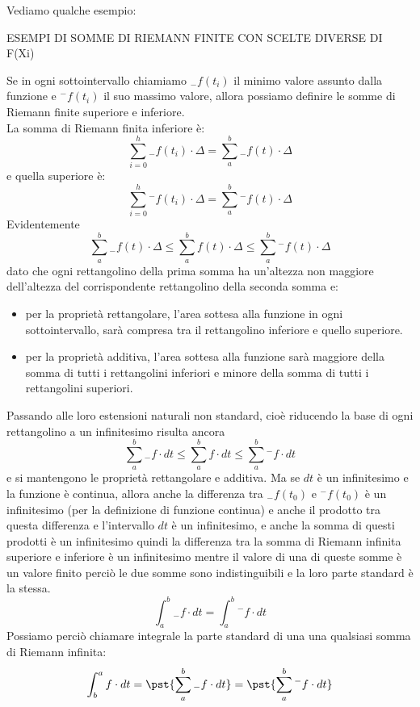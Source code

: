 Vediamo qualche esempio:

ESEMPI DI SOMME DI RIEMANN FINITE CON SCELTE DIVERSE DI F(Xi) %

Se in ogni sottointervallo chiamiamo \({}_{-}f(t_i)\) il minimo valore 
assunto dalla funzione e \({}^{-}f(t_i)\) il suo massimo valore, allora 
possiamo definire le somme di Riemann finite superiore e inferiore. \\
La somma di Riemann finita inferiore è: 
\[\sum_{i=0}^h{}_{-}f(t_i)\cdot\Delta = \sum_a^b{}_{-} f(t) \cdot \Delta\] 
e quella superiore è: 
\[\sum_{i=0}^h {}^{-}f(t_i)\cdot\Delta = \sum_a^b {}^{-}f(t) \cdot \Delta\]
Evidentemente 
\[\sum_a^b{}_{-}f(t) \cdot \Delta \le \sum_a^b f(t) \cdot \Delta \le 
\sum_a^b {}^{-}f(t) \cdot \Delta\] 
dato che ogni rettangolino della prima somma ha un'altezza non maggiore 
dell'altezza del corrispondente rettangolino della seconda somma e:

\begin{itemize} [nosep]
 \item per la proprietà rettangolare, l'area sottesa alla funzione in ogni 
sottointervallo, sarà compresa tra il rettangolino inferiore e quello 
superiore.
 \item per la proprietà additiva, l'area sottesa alla funzione sarà maggiore 
della somma di tutti i rettangolini inferiori e minore della somma di tutti i 
rettangolini superiori.
\end{itemize}

\begin{minipage}{.49\textwidth}
\begin{inaccessibleblock} 
  \riemanninferiore
\end{inaccessibleblock}
\end{minipage}
\hfill
\begin{minipage}{.49\textwidth}
\begin{inaccessibleblock} 
  \riemannsuperiore
\end{inaccessibleblock}
\end{minipage}

  Passando alle loro estensioni naturali non standard, cioè riducendo la base 
di ogni rettangolino a un infinitesimo risulta ancora 
\[\sum_a^b {}_{-}f \cdot dt \le \sum_a^b f \cdot dt \le 
  \sum_a^b {}^{-}f \cdot dt\] 
e si mantengono le proprietà rettangolare e additiva. 
Ma se \(dt\) è un infinitesimo e la funzione è continua, allora anche la 
differenza tra \({}_{-}f(t_0)\) e \({}^{-}f(t_0)\) è un infinitesimo (per la 
definizione di funzione continua) e anche il prodotto tra questa differenza e 
l'intervallo \(dt\) è un infinitesimo, e anche la somma di questi prodotti è 
un infinitesimo quindi la differenza tra la somma di Riemann infinita 
superiore e inferiore è un infinitesimo mentre il valore di una di queste 
somme è un valore finito perciò le due somme sono indistinguibili e la loro 
parte standard è la stessa.
\[\int_a^b {}_{-}f \cdot dt = \int_a^b {}^{-}f \cdot dt\]
Possiamo perciò chiamare integrale la parte standard di una una qualsiasi 
somma di Riemann infinita:
\[\int_b^a f \cdot dt = \pst{\sum_a^b {}_{-}f \cdot dt} =
                        \pst{\sum_a^b {}^{-}f \cdot dt}\]


